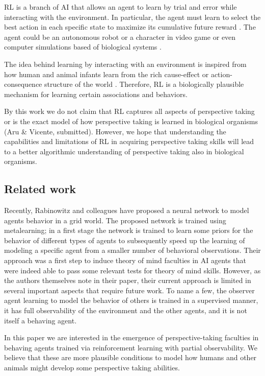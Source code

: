 \documentclass{article}
\begin{document}
RL is a branch of AI that allows an agent to learn by trial and error while interacting with the environment. In particular, the agent must learn to select the best action in each specific state to maximize its cumulative future reward \cite{sutton1998reinforcement}. The agent could be an autonomous robot \cite{lin1993reinforcement,yang2004multiagent,riedmiller2009reinforcement} or a character in video game \cite{mnih2015human} or even computer simulations based of biological systems \cite{amigoni2007multiagent}. 

\par 
The idea behind learning by interacting with an environment is inspired from how human and animal infants learn from the rich cause-effect or action-consequence structure of the world \cite{sutton1998reinforcement,thorndike1911animal,schultz1997neural}. Therefore, RL is a biologically plausible mechanism for learning certain associations and behaviors. 

By this work we do not claim that RL captures all aspects of perspective taking or is the exact model of how perspective taking is learned in biological organisms (Aru \& Vicente, submitted). However, we hope that understanding the capabilities and limitations of RL in acquiring perspective taking skills will lead to a better algorithmic understanding of perspective taking also in biological organisms.

\subsection{Related work}
Recently, Rabinowitz and colleagues have proposed a neural network to model agents behavior in a grid world. The proposed network is trained using metalearning; in a first stage the network is trained to learn some priors for the behavior of different types of agents to subsequently speed up the learning of modeling a specific agent from a smaller number of behavioral observations. Their approach was a first step to induce theory of mind faculties in AI agents that were indeed able to pass some relevant tests for theory of mind skills. However, as the authors themselves note in their paper, their current approach is limited in several important aspects that require future work. To name a few, the observer agent learning to model the behavior of others is trained in a supervised manner, it has full observability of the environment and the other agents, and it is not itself a behaving agent. 

In this paper we are interested in the emergence of perspective-taking faculties in behaving agents trained via reinforcement learning with partial observability. We believe that these are more plausible conditions to model how humans and other animals might develop some perspective taking abilities. 
\end{document}
